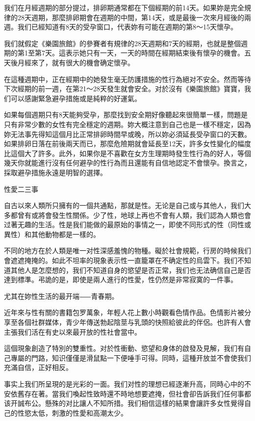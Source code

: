 \documentclass[12pt,UTF8]{ctexbook}
\begin{document}
我们在月經週期的部分提过，排卵期通常都在下個經期的前14天。如果妳是完全規律的28天週期，那麼排卵期會在週期的中間，第14天，或是最後一次來月經後的兩週。我们已經知道有8天的受孕窗口，代表妳有可能在週期的第8〜15天懷孕。

我们就假定《樂園旅館》的參賽者有規律的28天週期和7天的經期，也就是整個週期的第1至第7天。這表示她只有一天，一天的時間在經期結束後有懷孕的機會。五天後月經來了，就有很大的機會确定懷孕。

在這種週期中，正在經期中的她發生毫无防護措施的性行為絕对不安全。然而等待下次經期的前一週，在第21〜28天發生就會安全。对於沒有《樂園旅館》寶寶，我们可以感謝緊急避孕措施或是純粹的好運氣。

如果每個週期只有8天能夠受孕，那麼找到安全期好像聽起來很簡單一樣，問題是只有非常少數的女性有完全穩定的週期。妳大概注意到自己也是一樣不穩定，因為妳无法事先得知這個月比正常排卵時間早或晚，所以妳必須延長受孕窗口的天數。如果排卵日落在前後兩天而已，那麼危險期就會延長至12天，許多女性變化的幅度比這個大了許多。此外，如果你是不喜歡在女方生理期時發生性行為的好人，等個幾天你就能進行沒有任何避孕的性行為而且還能有自信地認定不會懷孕。換言之，採取避孕措施永遠是明智的選擇。





性愛二三事





自古以來人類所只擁有的一個共通點，那就是性。无论是自己或与其他人，我们大多都曾有或將會發生性關係。少了性，地球上再也不會有人類，我们認為人類也會过著无趣的生活。性是我们能做的最原始的事情之一，即使不同形式的性（同性或異性）和其他動物都是一樣的。

不同的地方在於人類是唯一对性深感羞愧的物種。礙於社會規範，行房的時候我们會遮遮掩掩的。如此不坦率的現象表示性一直籠罩在不确定性的烏雲下。我们不知道其他人是怎麼想的，我们不知道自身的慾望是否正常，我们也无法确信自己是否達到標準。弔詭的是，即使是兩人進行的性愛，性仍然是非常寂寞的一件事。

尤其在妳性生活的最开端⸺青春期。

近年來与性有關的書籍包罗萬象，年輕人花上數小時觀看色情作品。色情影片被分享至各個社群媒体，青少年傳送勃起陰莖与乳頭的快照給彼此的伴侶。也許有人會主張我们活在有史以來最开放的性社會當中。

這個現象創造了特別的雙重性。对於性衝動、慾望和身体的啟發及見解，我们有自己專屬的門路，知识僅僅是滑鼠點一下便唾手可得。同時，這種开放並不會使我们充滿自信，正好相反。

事实上我们所呈現的是光彩的一面。我们对性的理想已經逐漸升高，同時心中的不安依舊存在著。當我们喚起性致時還不時地想要遮掩，但社會卻告訴我们任何事都该开誠布公。懸殊的对比讓人不知所措。我们相信這樣的結果會讓許多女性覺得自己的性慾太低，刺激的性愛和高潮太少。
\end{document}

